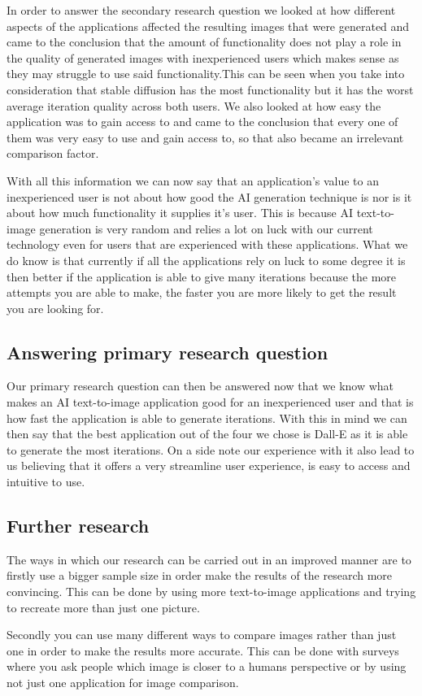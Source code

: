 \documentclass[]{report}
\begin{document}
	In order to answer the secondary research question we looked at how different aspects of the applications affected the resulting images that were generated and came to the conclusion that the amount of functionality does not play a role in the quality of generated images with inexperienced users which makes sense as they may struggle to use said functionality.This can be seen when you take into consideration that stable diffusion has the most functionality but it has the worst average iteration quality across both users. 
	We also looked at how easy the application was to gain access to and came to the conclusion that every one of them was very easy to use and gain access to, so that also became an irrelevant comparison factor.
	
	With all this information we can now say that an application's value to an inexperienced user is not about how good the AI generation technique is nor is it about how much functionality it supplies it's user. This is because AI text-to-image generation is very random and relies a lot on luck with our current technology even for users that are experienced with these applications. What we do know is that currently if all the applications rely on luck to some degree it is then better if the application is able to give many iterations because the more attempts you are able to make, the faster you are more likely to get the result you are looking for. 
	
	\subsection{Answering primary research question}
	
	Our primary research question can then be answered now that we know what makes an AI text-to-image application good for an inexperienced user and that is how fast the application is able to generate iterations. With this in mind we can then say that the best application out of the four we chose is Dall-E as it is able to generate the most iterations. On a side note our experience with it also lead to us believing that it offers a very streamline user experience, is easy to access and intuitive to use.
	
	\subsection{Further research}
	
	The ways in which our research can be carried out in an improved manner are to firstly use a bigger sample size in order make the results of the research more convincing. This can be done by using more text-to-image applications and trying to recreate more than just one picture. 
	
	Secondly you can use many different ways to compare images rather than just one in order to make the results more accurate. This can be done with surveys where you ask people which image is closer to a humans perspective or by using not just one application for image comparison.
	
\end{document}
